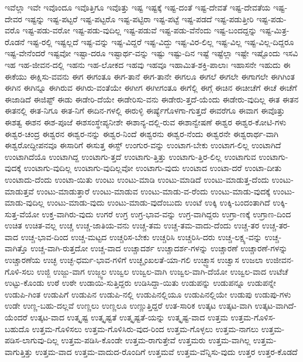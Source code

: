 {ಇವೆಲ್ಲಾ
ಇವೇ
ಇವೊಂದೂ
ಇವೊತ್ತಿಗೂ
ಇವೊತ್ತು
ಇಷ್ಟ
ಇಷ್ಟಕ್ಕೆ
ಇಷ್ಟ-ದಂತೆ
ಇಷ್ಟ-ದೇವತೆ
ಇಷ್ಟ-ದೇವತೆಯ
ಇಷ್ಟ-ದೇವರ
ಇಷ್ಟನ್ನು
ಇಷ್ಟ-ಪಟ್ಟರೆ
ಇಷ್ಟ-ಪಟ್ಟರೊ
ಇಷ್ಟ-ಪಟ್ಟಿರಾ
ಇಷ್ಟ-ಪಟ್ಟೆ
ಇಷ್ಟ-ಪಡದೆ
ಇಷ್ಟ-ಪಡುತ್ತೀರಿ
ಇಷ್ಟ-ಪಡು-ವರೊ
ಇಷ್ಟ-ಪಡು-ವರೋ
ಇಷ್ಟ-ಪಡು-ವುದಿಲ್ಲ
ಇಷ್ಟ-ಪಡುವೆ
ಇಷ್ಟ-ಪಡು-ವೆನೆಂದು
ಇಷ್ಟ-ಬಂದದ್ದನ್ನು
ಇಷ್ಟ-ಮಿತ್ರ-ರೊಡನೆ
ಇಷ್ಟ-ರಲ್ಲಿ
ಇಷ್ಟಲ್ಲದೆ
ಇಷ್ಟ-ವನ್ನು
ಇಷ್ಟ-ವಿದ್ದರೆ
ಇಷ್ಟ-ವಿದ್ದು
ಇಷ್ಟ-ವಿರ-ಲಿಲ್ಲ
ಇಷ್ಟ-ವಿಲ್ಲ
ಇಷ್ಟ-ವಿಲ್ಲ-ದಿದ್ದರೂ
ಇಷ್ಟ-ವೇನೆಂದರೆ
ಇಷ್ಟವೋ
ಇಷ್ಟಾ-ದರೂ
ಇಷ್ಟಾರ್ಥ-ವನ್ನು
ಇಷ್ಟು
ಇಷ್ಟು-ದಿನ
ಇಷ್ಟೆ
ಇಷ್ಟೆಲ್ಲಾ
ಇಷ್ಟೇ
ಇಷ್ಟೊಂದು
ಇಸವಿ
ಇಹ
ಇಹ-ಜೀವನ-ದಲ್ಲಿ
ಇಹನು
ಇಹ-ಲೋಕದ
ಇಹವು
ಇಹವೂ
ಇಹಾಮಿತ-ಶಕ್ತಿ-ಪಾಲಾಃ
ಇಹಾಸನೇ
ಇಹುದು
ಈ
ಈಕೆಯು
ಈಕ್ಷಿಸು-ವವನು
ಈಗ
ಈಗಂತೂ
ಈಗ-ತಾನೆ
ಈಗ-ತಾನೇ
ಈಗಲೂ
ಈಗಲೆ
ಈಗಲೇ
ಈಗಾಗಲೇ
ಈಗಿಗಿಂತ
ಈಗಿನ
ಈಗಿನ್ನೂ
ಈಗಿರುವ
ಈಗಿರು-ವಂತೆಯೇ
ಈಗೀಗ
ಈಗೀಗಂತೂ
ಈಗೆಲ್ಲಿ
ಈಗ್ಗೆ
ಈಚಿನ
ಈಚೀಚೆಗೆ
ಈಚೆ
ಈಚೆಗೆ
ಈಜಾಡಿದೆ
ಈಜಿಪ್ಟ್
ಈಡು
ಈಡೇರಿ-ದೆಯೇ
ಈಡೇರಿಸು-ವನು
ಈಡೇರು-ತ್ತದೆ-ಯೆಂದು
ಈಡೇರು-ವುದಿಲ್ಲ
ಈತ
ಈತನ
ಈತನಲ್ಲಿ
ಈತ-ನಿಗೂ
ಈತ-ನಿಗೆ
ಈದಿನ-ಗಳಲ್ಲಿ
ಈರುಳ್ಳಿ
ಈರ್ಷ್ಯೆಗೊಳಗಾ-ಗುತ್ತದೆ
ಈವರೆಗೂ
ಈವಾಗ
ಈವೊತ್ತು
ಈಶತ್ವ
ಈಶನ
ಈಶ-ಪೂಜೆ
ಈಶಸಂಸ್ಥೇಪ್ಯನೀಶೇ
ಈಶಾನ್ಯ-ದಲ್ಲಿ-ರುವ
ಈಶಾನ್ವೇಷಣೆ
ಈಶ್ವರ
ಈಶ್ವರ-ಕೋಟಿ-ಗಳು
ಈಶ್ವರ-ಚಂದ್ರ
ಈಶ್ವರನ
ಈಶ್ವರ-ನನ್ನು
ಈಶ್ವರ-ನಿಂದೆ
ಈಶ್ವರನು
ಈಶ್ವರ-ನೆಂದು
ಈಶ್ವರನೇ
ಈಶ್ವರಾರ್ಥ-ವಾಗಿ
ಈಶ್ವರೋದ್ದೀಪನವೂ
ಈಸಾರಿಗೆ
ಈಸುತ್ತ
ಈಸ್ಟ್
ಉಂಗುರ-ವನ್ನು
ಉಂಟಾಗ-ಬೇಕು
ಉಂಟಾಗ-ಲಿಲ್ಲ
ಉಂಟಾಗಿದೆ
ಉಂಟಾಗಿದೆಯೊ
ಉಂಟಾಗಿದ್ದ
ಉಂಟಾಗು-ತ್ತದೆ
ಉಂಟಾಗು-ತ್ತಿತ್ತು
ಉಂಟಾಗು-ತ್ತಿರ-ಲಿಲ್ಲ
ಉಂಟಾಗುವ
ಉಂಟಾಗು-ವುದಕ್ಕೆ
ಉಂಟಾಗು-ವುದಿಲ್ಲ
ಉಂಟಾಗು-ವುದಿಲ್ಲವೋ
ಉಂಟಾಗು-ವುದು
ಉಂಟಾದ
ಉಂಟಾ-ದರೆ
ಉಂಟಾ-ದೀತು
ಉಂಟಾದು-ದೆಂದು
ಉಂಟಾ-ಯಿತು
ಉಂಟು
ಉಂಟು-ಮಾಡಿ
ಉಂಟು-ಮಾಡಿದೆ
ಉಂಟು-ಮಾಡುತ್ತ-ದೆಂದು
ಉಂಟು-ಮಾಡುತ್ತವೆ
ಉಂಟು-ಮಾಡುತ್ತಾರೆ
ಉಂಟು-ಮಾಡುವ
ಉಂಟು-ಮಾಡು-ವ-ರೆಂದು
ಉಂಟು-ಮಾಡು-ವುದಕ್ಕೆ
ಉಂಟು-ಮಾಡು-ವುದಿಲ್ಲ
ಉಂಟು-ಮಾಡು-ವುದು
ಉಂಟು-ಮಾಡು-ವುದೆಂಬುದು
ಉಂಟೆ
ಉಕ್ಕಿ
ಉಕ್ಕಿ-ಬಂದಂತಾಗಿದೆ
ಉಕ್ಕಿ-ಸುತ್ತ-ವೆಯೋ
ಉಕ್ತ-ವಾಗಿರು-ವುದು
ಉಗರೆ
ಉಗ್ರ
ಉಗ್ರ-ಭಾವ-ವನ್ನು
ಉಗ್ರ-ವಾಗಿದ್ದರು
ಉಗ್ರಾ-ಣಕ್ಕೆ
ಉಗ್ರಾಣ-ದಿಂದ
ಉಚಿತ
ಉಚಿತ-ವಲ್ಲ
ಉಚ್ಚ
ಉಚ್ಚ-ಜಾತಿಯ-ವನು
ಉಚ್ಚ-ತಮ
ಉಚ್ಚ-ತಮ-ವಾದು-ದೆಂದು
ಉಚ್ಚ-ತರ
ಉಚ್ಚ-ತರ-ವಾದ
ಉಚ್ಚ-ಭಾವ-ದಿಂದ
ಉಚ್ಚ-ಮಟ್ಟದ
ಉಚ್ಚರಿಸ-ಬೇಕು
ಉಚ್ಚರಿಸಿ
ಉಚ್ಚರಿಸಿ-ದರು
ಉಚ್ಚ-ಲಕ್ಷ್ಯ-ವನ್ನು
ಉಚ್ಚ-ವಾಗಿತ್ತೊ
ಉಚ್ಚ-ವಾಗಿ-ರುತ್ತದೋ
ಉಚ್ಚ-ವಾದ
ಉಚ್ಚಾದರ್ಶ
ಉಚ್ಚಾದರ್ಶ-ಗಳನ್ನು
ಉಚ್ಚಾರಣೆ
ಉಚ್ಚಾರಣೆ-ಗಳನ್ನು
ಉಚ್ಚಾರಣೆಯ
ಉಚ್ಛ
ಉಚ್ಛ-ಧರ್ಮ-ಭಾವ-ಗಳಿಗೆ
ಉಚ್ಛೃಂಖಲತೆ-ಯಾ-ಗಲಿ
ಉಚ್ಛ್ವಾಸ
ಉಚ್ವಾಸ
ಉಜಲಾ
ಉಜೀವನ-ಗೊಳಿ-ಸಲು
ಉಜ್ಜಿ
ಉಜ್ಜು-ವಾಗ
ಉಜ್ಜ್ವಲ
ಉಜ್ವಲ
ಉಜ್ವಲ-ವಾಗಿ
ಉಜ್ವಲ-ವಾಗಿ-ದೆಯೋ
ಉಜ್ವಲ-ವಾದ
ಉಟೆಚೆ
ಉಟ್ಟು-ಕೊಂಡು
ಉಠೆ
ಉಠೇ
ಉಡಾಯಿ-ಸುತ್ತಿದ್ದರು
ಉಡಿಸಿದ್ದಾ-ಯಿತು
ಉಡುಪನ್ನು
ಉಡುಪನ್ನೂ
ಉಡುಪನ್ನೇ
ಉಡುಪಿ-ಗಿಂತ
ಉಡುಪಿಗೆ
ಉಡುಪಿನ
ಉಡುಪಿ-ನಲ್ಲಿ
ಉಡುಪಿನಲ್ಲಿಯೂ
ಉಡುಪಿನಲ್ಲಿಯೇ
ಉಡುಪು
ಉಡುಪು-ಗಳು
ಉಡೇ
ಉಣ್ಣ-ಬಹು-ದಲ್ಲವೆ
ಉಣ್ಣಲು
ಉಣ್ಣಲೂ
ಉಣ್ಣುತ್ತಿದ್ದರೆ
ಉತ-ಸಾರಿಕ
ಉತ್ಕಟ
ಉತ್ಕಟ-ವಾಗಿ
ಉತ್ಕಟ-ವಾಗಿದೆ-ಯೆಂದರೆ
ಉತ್ಕಟ-ವಾದ
ಉತ್ಕೃಷ್ಟ
ಉತ್ಕೃಷ್ಟತೆ
ಉತ್ಕೃಷ್ಟತೆ-ಯನ್ನು
ಉತ್ಕೃಷ್ಟ-ವಾದ
ಉತ್ತಮ
ಉತ್ತಮ-ಗೊಳಿಸ-ಬಹುದೊ
ಉತ್ತಮ-ಗೊಳಿಸಲು
ಉತ್ತಮ-ಗೊಳಿಸಿರು-ವುದ-ರಿಂದ
ಉತ್ತಮ-ಗೊಳ್ಳಲು
ಉತ್ತಮ-ನಾಗಲು
ಉತ್ತಮ-ಪಡಿಸ-ಲಾಗುವು-ದಿಲ್ಲ
ಉತ್ತಮ-ಪಡಿಸಿ-ಕೊಂಡೇ
ಉತ್ತಮ-ರಾಗುತ್ತೇವೆ
ಉತ್ತಮರು
ಉತ್ತಮ-ವಾಗಿಲ್ಲ
ಉತ್ತಮ-ವಾಗುತ್ತಿತ್ತು
ಉತ್ತಮ-ವಾದ
ಉತ್ತಮ-ವಾದುದ-ರೊಂದಿಗೆ
ಉತ್ತಮವೆ
ಉತ್ತಮ-ವೆನ್ನಿಸು-ವುದು
ಉತ್ತರ
ಉತ್ತರ-ಕೊಡದೆ
}
